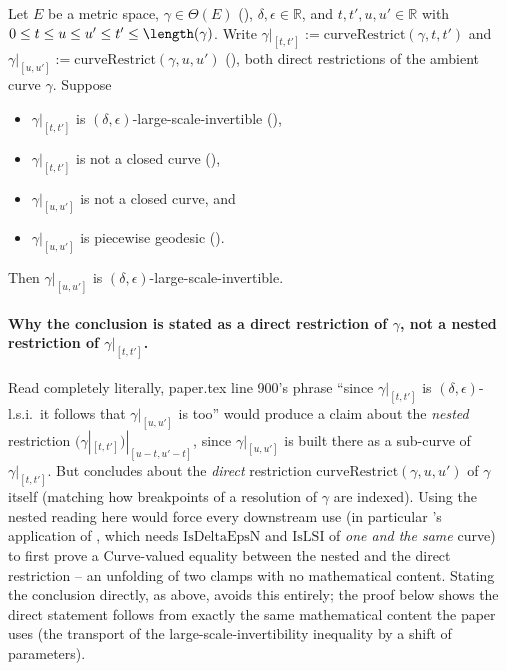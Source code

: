 \begin{lemma}
  Let $E$ be a metric space, $\gamma \in \Theta(E)$ (), $\delta,\epsilon \in
  \mathbb{R}$, and $t,t',u,u' \in \mathbb{R}$ with $0 \le t \le u \le u' \le t' \le \length(\gamma)$.
  Write $\gamma|_{[t,t']} := \mathrm{curveRestrict}(\gamma,t,t')$ and $\gamma|_{[u,u']} :=
  \mathrm{curveRestrict}(\gamma,u,u')$ (), both direct restrictions of the
  ambient curve $\gamma$. Suppose
  \begin{itemize}
    \item $\gamma|_{[t,t']}$ is $(\delta,\epsilon)$-large-scale-invertible (),
    \item $\gamma|_{[t,t']}$ is not a closed curve (),
    \item $\gamma|_{[u,u']}$ is not a closed curve, and
    \item $\gamma|_{[u,u']}$ is piecewise geodesic ().
  \end{itemize}
  Then $\gamma|_{[u,u']}$ is $(\delta,\epsilon)$-large-scale-invertible.

  \paragraph{Why the conclusion is stated as a direct restriction of $\gamma$, not a nested
  restriction of $\gamma|_{[t,t']}$.} Read completely literally, paper.tex line 900's phrase
  ``since $\gamma|_{[t,t']}$ is $(\delta,\epsilon)$-l.s.i.\ it follows that $\gamma|_{[u,u']}$ is
  too'' would produce a claim about the \emph{nested} restriction
  $(\gamma|_{[t,t']})|_{[u-t,u'-t]}$, since $\gamma|_{[u,u']}$ is built there as a sub-curve of
  $\gamma|_{[t,t']}$. But  concludes about the
  \emph{direct} restriction $\mathrm{curveRestrict}(\gamma,u,u')$ of $\gamma$ itself (matching how
  breakpoints of a resolution of $\gamma$ are indexed). Using the nested reading here would force
  every downstream use (in particular 's application of ,
  which needs $\mathrm{IsDeltaEpsN}$ and $\mathrm{IsLSI}$ of \emph{one and the same} curve) to
  first prove a $\mathrm{Curve}$-valued equality between the nested and the direct restriction --
  an unfolding of two clamps with no mathematical content. Stating the conclusion directly, as
  above, avoids this entirely; the proof below shows the direct statement follows from exactly the
  same mathematical content the paper uses (the transport of the large-scale-invertibility
  inequality by a shift of parameters).


\end{lemma}
